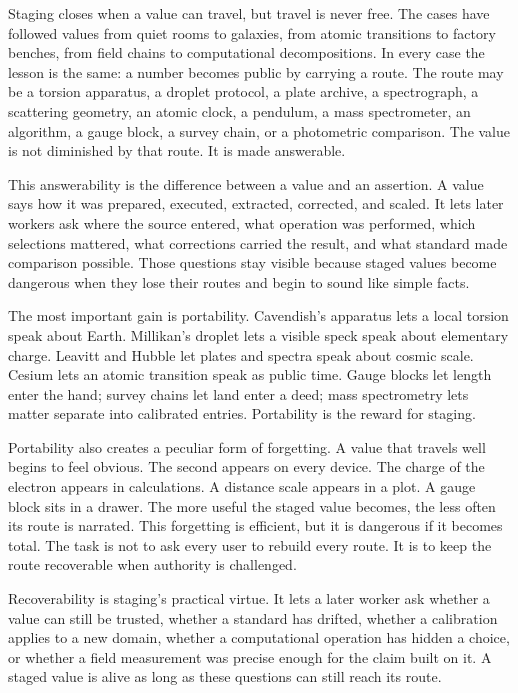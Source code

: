 \begin{movementclose}
Staging closes when a value can travel, but travel is never free. The cases
have followed values from quiet rooms to galaxies, from atomic transitions
to factory benches, from field chains to computational decompositions. In
every case the lesson is the same: a number becomes public by carrying a
route. The route may be a torsion apparatus, a droplet protocol, a plate
archive, a spectrograph, a scattering geometry, an atomic clock, a
pendulum, a mass spectrometer, an algorithm, a gauge block, a survey
chain, or a photometric comparison. The value is not diminished by that
route. It is made answerable.

This answerability is the difference between a value and an assertion. A
value says how it was prepared, executed, extracted, corrected, and
scaled. It lets later workers ask where the source entered, what
operation was performed, which selections mattered, what corrections
carried the result, and what standard made comparison possible. Those
questions stay visible because staged values become dangerous when they
lose their routes and begin to sound like simple facts.

The most important gain is portability. Cavendish's apparatus lets a
local torsion speak about Earth. Millikan's droplet lets a visible speck
speak about elementary charge. Leavitt and Hubble let plates and spectra
speak about cosmic scale. Cesium lets an atomic transition speak as
public time. Gauge blocks let length enter the hand; survey chains let
land enter a deed; mass spectrometry lets matter separate into
calibrated entries. Portability is the reward for staging.

Portability also creates a peculiar form of forgetting. A value that
travels well begins to feel obvious. The second appears on every device.
The charge of the electron appears in calculations. A distance scale
appears in a plot. A gauge block sits in a drawer. The more useful the
staged value becomes, the less often its route is narrated. This
forgetting is efficient, but it is dangerous if it becomes total. The
task is not to ask every user to rebuild every route. It is to keep the
route recoverable when authority is challenged.

Recoverability is staging's practical virtue. It lets a later worker
ask whether a value can still be trusted, whether a standard has
drifted, whether a calibration applies to a new domain, whether a
computational operation has hidden a choice, or whether a field
measurement was precise enough for the claim built on it. A staged
value is alive as long as these questions can still reach its route.


\end{movementclose}
